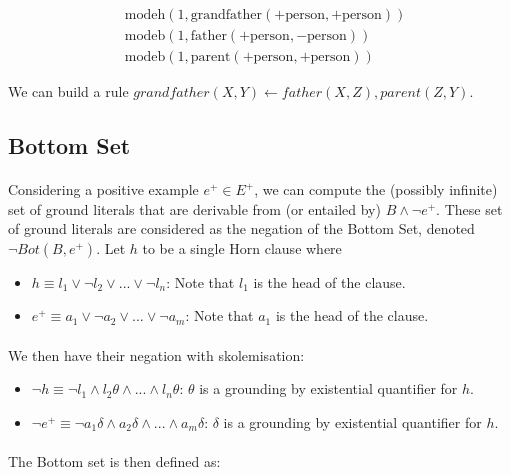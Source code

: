 \documentclass{article}
\theoremstyle{plain}
\theoremstyle{definition}
\begin{document}
\begin{multicols}{2}
\begin{align*}
	&\text{modeh}(1, \text{grandfather}(+\text{person}, +\text{person}))\\
	&\text{modeb}(1, \text{father}(+\text{person}, -\text{person}))\\
	&\text{modeb}(1, \text{parent}(+\text{person}, +\text{person}))
\end{align*}

We can build a rule $grandfather(X, Y) \leftarrow father(X, Z), parent(Z, Y)$.

\subsection{Bottom Set}

\paragraph{} Considering a positive example $e^+ \in E^+$, we can compute the (possibly infinite) set of ground literals that are derivable from (or entailed by) $B \land \lnot e^+$. These set of ground literals are considered as the negation of the Bottom Set, denoted $\lnot Bot(B, e^+)$. Let $h$ to be a single Horn clause where

\begin{itemize}
\item $h \equiv l_1 \lor \lnot l_2 \lor ... \lor \lnot l_n$: Note that $l_1$ is the head of the clause.
\item $e^+ \equiv a_1 \lor \lnot a_2 \lor ... \lor \lnot a_m$: Note that $a_1$ is the head of the clause.
\end{itemize}

\paragraph{} We then have their negation with skolemisation:

\begin{itemize}
\item $\lnot h \equiv \lnot l_1 \land l_2\theta \land ... \land l_n\theta$: $\theta$ is a grounding by existential quantifier for $h$.
\item $\lnot e^+ \equiv \lnot a_1\delta \land a_2\delta \land ... \land a_m\delta$: $\delta$ is a grounding by existential quantifier for $h$.
\end{itemize}

\paragraph{} The Bottom set is then defined as:


\end{multicols}
\end{document}
